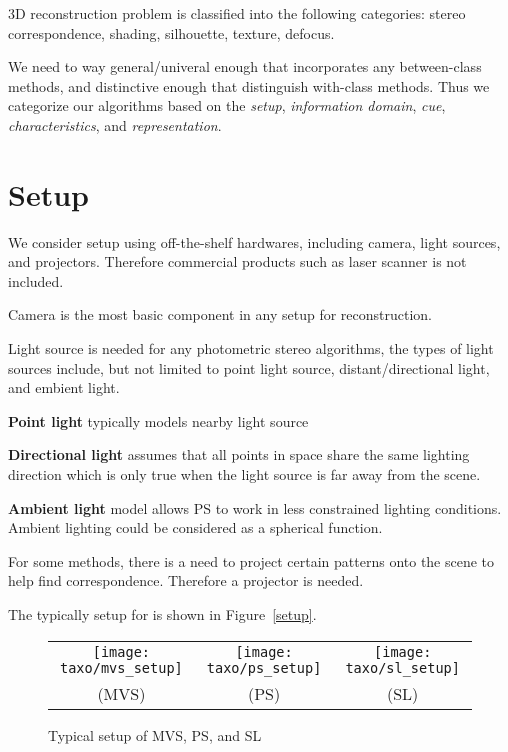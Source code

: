 3D reconstruction problem is classified into the following categories: stereo correspondence, shading, silhouette, texture, defocus.

We need to way general/univeral enough that incorporates any between-class methods, and distinctive enough that distinguish with-class methods. Thus we categorize our algorithms based on the \textit{setup}, \textit{information domain}, \textit{cue}, \textit{characteristics}, and \textit{representation}.

\section{Setup}
We consider setup using off-the-shelf hardwares, including camera, light sources, and projectors. Therefore commercial products such as laser scanner is not included.

Camera is the most basic component in any setup for reconstruction.

Light source is needed for any photometric stereo algorithms, the types of light sources include, but not limited to point light source, distant/directional light, and embient light.

\textbf{Point light} typically models nearby light source

\textbf{Directional light} assumes that all points in space share the same lighting direction which is only true when the light source is far away from the scene.

\textbf{Ambient light} model allows PS to work in less constrained lighting conditions. Ambient lighting could be considered as a spherical function.

For some methods, there is a need to project certain patterns onto the scene to help find correspondence. Therefore a projector is needed.

The typically setup for is shown in Figure~\ref{setup}.
\begin{figure}[h]
\centering
\begin{tabular}{ccc}
\texttt{[image: taxo/mvs\_setup]}&
\texttt{[image: taxo/ps\_setup]}&
\texttt{[image: taxo/sl\_setup]}\\
(MVS) & (PS) & (SL)\\
\end{tabular}
\caption{Typical setup of MVS, PS, and SL}
\label{fig:setup}
\end{figure}

